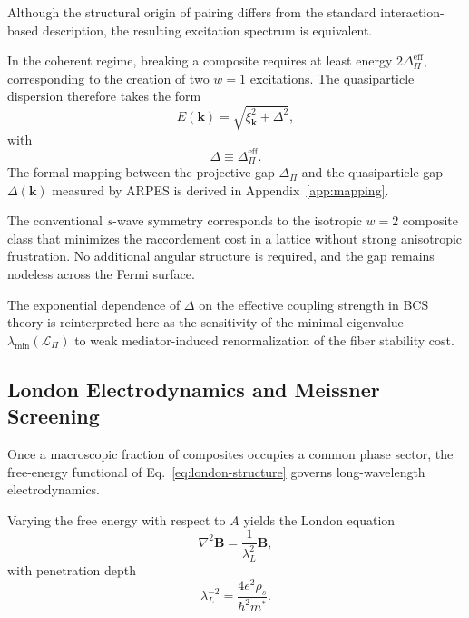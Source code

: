     Although the structural origin of pairing
    differs from the standard interaction-based description,
    the resulting excitation spectrum is equivalent.

    In the coherent regime,
    breaking a composite requires
    at least energy $2\Delta_\Pi^{\mathrm{eff}}$,
    corresponding to the creation of two $w=1$ excitations.
    The quasiparticle dispersion therefore takes the form
    \begin{equation}
      E(\mathbf{k})
      =
      \sqrt{
        \xi_{\mathbf{k}}^2
        +
        \Delta^2
      },
    \end{equation}
    with
    \begin{equation}
      \Delta
      \equiv
      \Delta_\Pi^{\mathrm{eff}} .
    \end{equation}
    The formal mapping between the projective gap
    $\Delta_\Pi$ and the quasiparticle gap
    $\Delta(\mathbf{k})$ measured by ARPES
    is derived in Appendix~\ref{app:mapping}.

    The conventional $s$-wave symmetry
    corresponds to the isotropic $w=2$ composite class
    that minimizes the raccordement cost
    in a lattice without strong anisotropic frustration.
    No additional angular structure is required,
    and the gap remains nodeless across the Fermi surface.

    The exponential dependence of $\Delta$
    on the effective coupling strength in BCS theory
    is reinterpreted here
    as the sensitivity of the minimal eigenvalue
    $\lambda_{\min}(\mathcal{L}_\Pi)$
    to weak mediator-induced renormalization
    of the fiber stability cost.

  \subsection{London Electrodynamics and Meissner Screening}
    \label{subsec:london-meissner}

    Once a macroscopic fraction of composites
    occupies a common phase sector,
    the free-energy functional
    of Eq.~\ref{eq:london-structure}
    governs long-wavelength electrodynamics.

    Varying the free energy with respect to $A$
    yields the London equation
    \begin{equation}
      \nabla^2 \mathbf{B}
      =
      \frac{1}{\lambda_L^2}
      \mathbf{B},
      \label{eq:london-equation}
    \end{equation}
    with penetration depth
    \begin{equation}
      \lambda_L^{-2}
      =
      \frac{4 e^2 \rho_s}{\hbar^2 m^*}.
    \end{equation}

